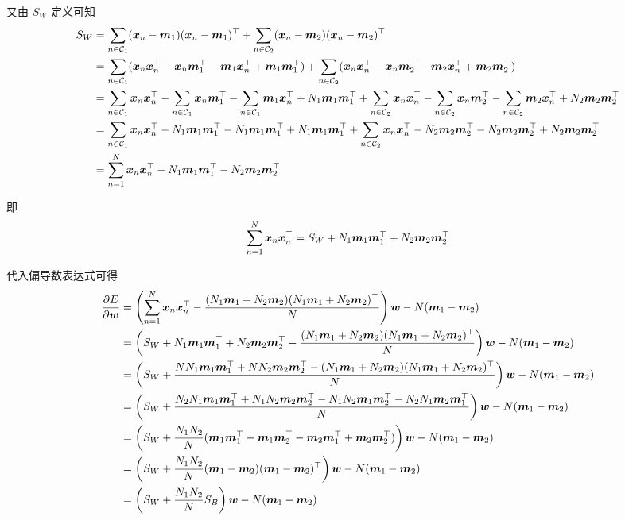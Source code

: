 \documentclass{article}
\begin{document}
又由 $S_W$ 定义可知
\begin{equation}
  \begin{aligned}
    S_{W}
    &=\sum_{n\in \mathcal{C}_{1}}(\bm{x}_{n}-\bm{m}_{1})(\bm{x}_{n}-\bm{m}_{1})^{\top}+\sum_{n\in \mathcal{C}_{2}}(\bm{x}_{n}-\bm{m}_{2})(\bm{x}_{n}-\bm{m}_{2})^{\top}\\
    &=\sum_{n\in \mathcal{C}_{1}}(\bm{x}_n\bm{x}_n^{\top}-\bm{x}_n\bm{m}_1^{\top}-\bm{m}_1\bm{x}_n^{\top}+\bm{m}_1\bm{m}_1^{\top})+\sum_{n\in \mathcal{C}_{2}}(\bm{x}_n\bm{x}_n^{\top}-\bm{x}_n\bm{m}_2^{\top}-\bm{m}_2\bm{x}_n^{\top}+\bm{m}_2\bm{m}_2^{\top})\\
    &=\sum_{n\in \mathcal{C}_{1}}\bm{x}_n\bm{x}_n^{\top}-\sum_{n\in \mathcal{C}_{1}}\bm{x}_n\bm{m}_1^{\top}-\sum_{n\in \mathcal{C}_{1}}\bm{m}_1\bm{x}_n^{\top}+N_1\bm{m}_1\bm{m}_1^{\top}+\sum_{n\in \mathcal{C}_{2}}\bm{x}_n\bm{x}_n^{\top}-\sum_{n\in \mathcal{C}_{2}}\bm{x}_n\bm{m}_2^{\top}-\sum_{n\in \mathcal{C}_{2}}\bm{m}_2\bm{x}_n^{\top}+N_2\bm{m}_2\bm{m}_2^{\top}\\
    &=\sum_{n\in \mathcal{C}_{1}}\bm{x}_n\bm{x}_n^{\top}-N_1\bm{m}_1\bm{m}_1^{\top}-N_1\bm{m}_1\bm{m}_1^{\top}+N_1\bm{m}_1\bm{m}_1^{\top}+\sum_{n\in \mathcal{C}_{2}}\bm{x}_n\bm{x}_n^{\top}-N_2\bm{m}_2\bm{m}_2^{\top}-N_2\bm{m}_2\bm{m}_2^{\top}+N_2\bm{m}_2\bm{m}_2^{\top}\\
    &=\sum_{n=1}^N\bm{x}_n\bm{x}_n^{\top}-N_1\bm{m}_1\bm{m}_1^{\top}-N_2\bm{m}_2\bm{m}_2^{\top}\\
  \end{aligned}
\end{equation}

即
\begin{equation}
  \sum_{n=1}^N\bm{x}_n\bm{x}_n^{\top}=S_W+N_1\bm{m}_1\bm{m}_1^{\top}+N_2\bm{m}_2\bm{m}_2^{\top}
\end{equation}

代入偏导数表达式可得
\begin{equation}
  \begin{aligned}
    \frac{\partial E}{\partial \bm{w}}
    &=\left(\sum_{n=1}^{N}\bm{x}_n\bm{x}_n^{\top}-\frac{(N_1\bm{m}_1+N_2\bm{m}_2) (N_1\bm{m}_1+N_2\bm{m}_2)^{\top}}{N}\right)\bm{w}-N(\bm{m}_1-\bm{m}_2)\\
    &=\left(S_W+N_1\bm{m}_1\bm{m}_1^{\top}+N_2\bm{m}_2\bm{m}_2^{\top}-\frac{(N_1\bm{m}_1+N_2\bm{m}_2) (N_1\bm{m}_1+N_2\bm{m}_2)^{\top}}{N}\right)\bm{w}-N(\bm{m}_1-\bm{m}_2)\\
    &=\left(S_W+\frac{NN_1\bm{m}_1\bm{m}_1^{\top}+NN_2\bm{m}_2\bm{m}_2^{\top}-(N_1\bm{m}_1+N_2\bm{m}_2) (N_1\bm{m}_1+N_2\bm{m}_2)^{\top}}{N}\right)\bm{w}-N(\bm{m}_1-\bm{m}_2)\\
    &=\left(S_W+\frac{N_2N_1\bm{m}_1\bm{m}_1^{\top}+N_1N_2\bm{m}_2\bm{m}_2^{\top}-N_1N_2\bm{m}_1\bm{m}_2^{\top}-N_2N_1\bm{m}_2\bm{m}_1^{\top}}{N}\right)\bm{w}-N(\bm{m}_1-\bm{m}_2)\\
    &=\left(S_W+\frac{N_1N_2}{N}(\bm{m}_1\bm{m}_1^{\top}-\bm{m}_1\bm{m}_2^{\top}-\bm{m}_2\bm{m}_1^{\top}+\bm{m}_2\bm{m}_2^{\top})\right)\bm{w}-N(\bm{m}_1-\bm{m}_2)\\
    &=\left(S_W+\frac{N_1N_2}{N}(\bm{m}_1-\bm{m}_2)(\bm{m}_1-\bm{m}_2)^{\top}\right)\bm{w}-N(\bm{m}_1-\bm{m}_2)\\
    &=\left(S_W+\frac{N_1N_2}{N}S_B\right)\bm{w}-N(\bm{m}_1-\bm{m}_2)\\
  \end{aligned}
\end{equation}
\end{document}

